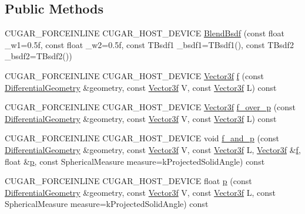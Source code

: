 \subsection*{Public Methods}
\begin{DoxyCompactItemize}
\item 
C\+U\+G\+A\+R\+\_\+\+F\+O\+R\+C\+E\+I\+N\+L\+I\+NE C\+U\+G\+A\+R\+\_\+\+H\+O\+S\+T\+\_\+\+D\+E\+V\+I\+CE \hyperlink{structcugar_1_1_blend_bsdf_af515289322a7ba88671802d09b4b3b9f}{Blend\+Bsdf} (const float \+\_\+w1=0.\+5f, const float \+\_\+w2=0.\+5f, const T\+Bsdf1 \+\_\+bsdf1=\+T\+Bsdf1(), const T\+Bsdf2 \+\_\+bsdf2=\+T\+Bsdf2())
\item 
C\+U\+G\+A\+R\+\_\+\+F\+O\+R\+C\+E\+I\+N\+L\+I\+NE C\+U\+G\+A\+R\+\_\+\+H\+O\+S\+T\+\_\+\+D\+E\+V\+I\+CE \hyperlink{structcugar_1_1_vector}{Vector3f} \hyperlink{structcugar_1_1_blend_bsdf_a5837aacab01105f3023c7653b82a5e65}{f} (const \hyperlink{structcugar_1_1_differential_geometry}{Differential\+Geometry} \&geometry, const \hyperlink{structcugar_1_1_vector}{Vector3f} V, const \hyperlink{structcugar_1_1_vector}{Vector3f} L) const
\item 
C\+U\+G\+A\+R\+\_\+\+F\+O\+R\+C\+E\+I\+N\+L\+I\+NE C\+U\+G\+A\+R\+\_\+\+H\+O\+S\+T\+\_\+\+D\+E\+V\+I\+CE \hyperlink{structcugar_1_1_vector}{Vector3f} \hyperlink{structcugar_1_1_blend_bsdf_a7d5ba65e5d6de1e48ffdf523f31e6cd6}{f\+\_\+over\+\_\+p} (const \hyperlink{structcugar_1_1_differential_geometry}{Differential\+Geometry} \&geometry, const \hyperlink{structcugar_1_1_vector}{Vector3f} V, const \hyperlink{structcugar_1_1_vector}{Vector3f} L) const
\item 
C\+U\+G\+A\+R\+\_\+\+F\+O\+R\+C\+E\+I\+N\+L\+I\+NE C\+U\+G\+A\+R\+\_\+\+H\+O\+S\+T\+\_\+\+D\+E\+V\+I\+CE void \hyperlink{structcugar_1_1_blend_bsdf_ac8354f275a1834a351d8347d922e6415}{f\+\_\+and\+\_\+p} (const \hyperlink{structcugar_1_1_differential_geometry}{Differential\+Geometry} \&geometry, const \hyperlink{structcugar_1_1_vector}{Vector3f} V, const \hyperlink{structcugar_1_1_vector}{Vector3f} L, \hyperlink{structcugar_1_1_vector}{Vector3f} \&\hyperlink{structcugar_1_1_blend_bsdf_a5837aacab01105f3023c7653b82a5e65}{f}, float \&\hyperlink{structcugar_1_1_blend_bsdf_a682a0bffe043ff21a03d519921bef7bc}{p}, const Spherical\+Measure measure=k\+Projected\+Solid\+Angle) const
\item 
C\+U\+G\+A\+R\+\_\+\+F\+O\+R\+C\+E\+I\+N\+L\+I\+NE C\+U\+G\+A\+R\+\_\+\+H\+O\+S\+T\+\_\+\+D\+E\+V\+I\+CE float \hyperlink{structcugar_1_1_blend_bsdf_a682a0bffe043ff21a03d519921bef7bc}{p} (const \hyperlink{structcugar_1_1_differential_geometry}{Differential\+Geometry} \&geometry, const \hyperlink{structcugar_1_1_vector}{Vector3f} V, const \hyperlink{structcugar_1_1_vector}{Vector3f} L, const Spherical\+Measure measure=k\+Projected\+Solid\+Angle) const

\end{DoxyCompactItemize}
